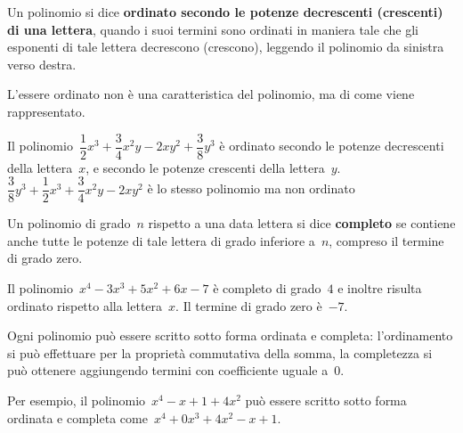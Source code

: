 \begin{definizione}{}{}
Un polinomio si dice \textbf{ordinato secondo le potenze decrescenti
(crescenti) di una lettera}, 
quando i suoi
termini sono ordinati in maniera tale che gli esponenti di tale lettera 
decrescono (crescono), leggendo il
polinomio da sinistra verso destra.
\end{definizione}

L'essere ordinato non è una caratteristica del polinomio, ma di come 
viene rappresentato.

\begin{esempio}{}{}
Il polinomio~\(\dfrac{1}{2}x^3+\dfrac{3}{4}x^2y-2xy^2+\dfrac{3}{8}y^3\) 
è ordinato secondo le potenze decrescenti della lettera~\(x\), e secondo 
le potenze crescenti della lettera~\(y\).\\
\(\dfrac{3}{8}y^3+\dfrac{1}{2}x^3+\dfrac{3}{4}x^2y-2xy^2\) è lo stesso
polinomio ma non ordinato
\end{esempio}

\begin{definizione}{}{}
Un polinomio di grado~\(n\) rispetto a una data lettera si dice 
\textbf{completo} se contiene
anche tutte le potenze di tale lettera di grado 
inferiore a~\(n\), compreso il termine di grado zero.
\end{definizione}

\begin{esempio}{}{}
Il polinomio~\(x^4-3x^3+5x^2+6x-7\) è completo di 
grado~\(4\) e inoltre risulta ordinato rispetto alla lettera~\(x\). Il 
termine di grado zero è~\(-7\).
\end{esempio}

\begin{osservazione}{}{}
Ogni polinomio può essere scritto sotto forma ordinata e completa: 
l'ordinamento si può effettuare per la proprietà commutativa della 
somma, 
la completezza si può ottenere aggiungendo termini 
con coefficiente uguale a~\(0\).

Per esempio, il polinomio~\(x^4-x+1+4x^2\) può essere scritto sotto forma 
ordinata e completa come~\(x^4+0x^3+4x^2-x+1\).
\end{osservazione}



